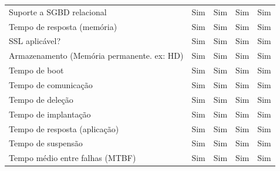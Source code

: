 \documentclass[conference]{IEEEtran}
\begin{document}
\begin{table}[]
\begin{tabular}{@{}lcccc@{}}
Suporte a SGBD relacional                         & Sim                                     & Sim                                     & Sim                                     & Sim                         \\
Tempo de resposta (memória)                       & Sim                                     & Sim                                     & Sim                                     & Sim                         \\
SSL aplicável?                                    & Sim                                     & Sim                                     & Sim                                     & Sim                         \\
Armazenamento (Memória permanente. ex: HD)        & Sim                                     & Sim                                     & Sim                                     & Sim                         \\
Tempo de boot                                     & Sim                                     & Sim                                     & Sim                                     & Sim                         \\
Tempo de comunicação                              & Sim                                     & Sim                                     & Sim                                     & Sim                         \\
Tempo de deleção                                  & Sim                                     & Sim                                     & Sim                                     & Sim                         \\
Tempo de implantação                              & Sim                                     & Sim                                     & Sim                                     & Sim                         \\
Tempo de resposta (aplicação)                     & Sim                                     & Sim                                     & Sim                                     & Sim                         \\
Tempo de suspensão                                & Sim                                     & Sim                                     & Sim                                     & Sim                         \\
Tempo médio entre falhas (MTBF)                   & Sim                                     & Sim                                     & Sim                                     & Sim                         \\

\end{tabular}
\end{table}
\end{document}

